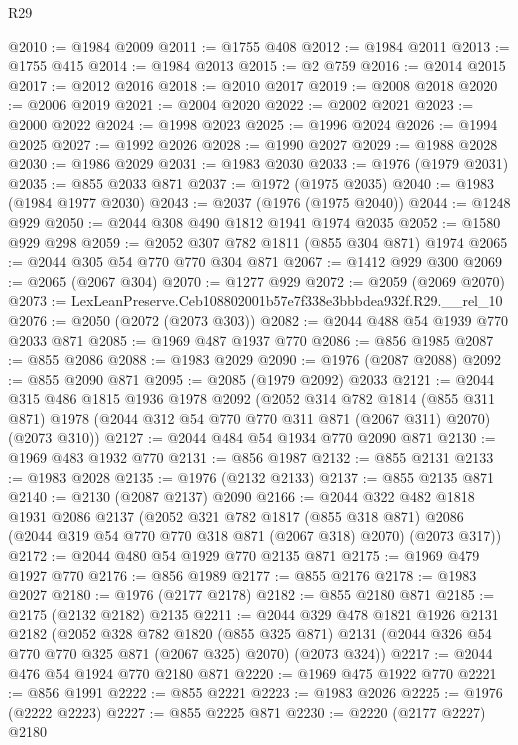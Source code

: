 \begin{lexlean}{R29}
\begin{coremodule}
@2010 := @1984 @2009
@2011 := @1755 @408
@2012 := @1984 @2011
@2013 := @1755 @415
@2014 := @1984 @2013
@2015 := @2 @759
@2016 := @2014 @2015
@2017 := @2012 @2016
@2018 := @2010 @2017
@2019 := @2008 @2018
@2020 := @2006 @2019
@2021 := @2004 @2020
@2022 := @2002 @2021
@2023 := @2000 @2022
@2024 := @1998 @2023
@2025 := @1996 @2024
@2026 := @1994 @2025
@2027 := @1992 @2026
@2028 := @1990 @2027
@2029 := @1988 @2028
@2030 := @1986 @2029
@2031 := @1983 @2030
@2033 := @1976 (@1979 @2031)
@2035 := @855 @2033 @871
@2037 := @1972 (@1975 @2035)
@2040 := @1983 (@1984 @1977 @2030)
@2043 := @2037 (@1976 (@1975 @2040))
@2044 := @1248 @929
@2050 := @2044 @308 @490 @1812 @1941 @1974 @2035
@2052 := @1580 @929 @298
@2059 := @2052 @307 @782 @1811 (@855 @304 @871) @1974
@2065 := @2044 @305 @54 @770 @770 @304 @871
@2067 := @1412 @929 @300
@2069 := @2065 (@2067 @304)
@2070 := @1277 @929
@2072 := @2059 (@2069 @2070)
@2073 := LexLeanPreserve.Ceb108802001b57e7f338e3bbbdea932f.R29.__rel_10
@2076 := @2050 (@2072 (@2073 @303))
@2082 := @2044 @488 @54 @1939 @770 @2033 @871
@2085 := @1969 @487 @1937 @770
@2086 := @856 @1985
@2087 := @855 @2086
@2088 := @1983 @2029
@2090 := @1976 (@2087 @2088)
@2092 := @855 @2090 @871
@2095 := @2085 (@1979 @2092) @2033
@2121 := @2044
    @315
    @486
    @1815
    @1936
    @1978
    @2092
    (@2052
      @314
      @782
      @1814
      (@855 @311 @871)
      @1978
      (@2044 @312 @54 @770 @770 @311 @871 (@2067 @311) @2070)
      (@2073 @310))
@2127 := @2044 @484 @54 @1934 @770 @2090 @871
@2130 := @1969 @483 @1932 @770
@2131 := @856 @1987
@2132 := @855 @2131
@2133 := @1983 @2028
@2135 := @1976 (@2132 @2133)
@2137 := @855 @2135 @871
@2140 := @2130 (@2087 @2137) @2090
@2166 := @2044
    @322
    @482
    @1818
    @1931
    @2086
    @2137
    (@2052
      @321
      @782
      @1817
      (@855 @318 @871)
      @2086
      (@2044 @319 @54 @770 @770 @318 @871 (@2067 @318) @2070)
      (@2073 @317))
@2172 := @2044 @480 @54 @1929 @770 @2135 @871
@2175 := @1969 @479 @1927 @770
@2176 := @856 @1989
@2177 := @855 @2176
@2178 := @1983 @2027
@2180 := @1976 (@2177 @2178)
@2182 := @855 @2180 @871
@2185 := @2175 (@2132 @2182) @2135
@2211 := @2044
    @329
    @478
    @1821
    @1926
    @2131
    @2182
    (@2052
      @328
      @782
      @1820
      (@855 @325 @871)
      @2131
      (@2044 @326 @54 @770 @770 @325 @871 (@2067 @325) @2070)
      (@2073 @324))
@2217 := @2044 @476 @54 @1924 @770 @2180 @871
@2220 := @1969 @475 @1922 @770
@2221 := @856 @1991
@2222 := @855 @2221
@2223 := @1983 @2026
@2225 := @1976 (@2222 @2223)
@2227 := @855 @2225 @871
@2230 := @2220 (@2177 @2227) @2180

\end{coremodule}
\end{lexlean}
